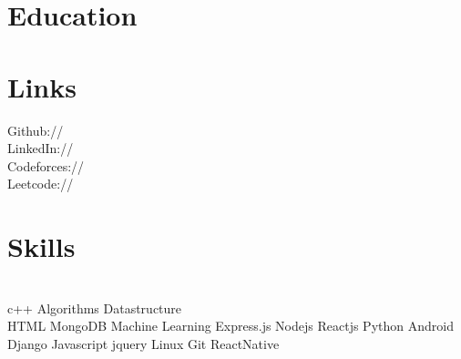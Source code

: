 \documentclass[]{deedy-resume-openfont}
\begin{document}
%
%
\lastupdated

%
%



%
%

\begin{minipage}[t]{0.33\textwidth} 


\section{Education} 

\sectionsep



\section{Links} 
Github:// \href{https://github.com/llucifer97}{} \\
LinkedIn://  \href{https://www.linkedin.com/in/ayush-raj97/}{} \\
Codeforces://  \href{https://codeforces.com/profile/ayush_raj97}{} \\
Leetcode://  \href{https://leetcode.com/llucifer97/}{}
\sectionsep



\section{Skills}
\\
c++ \textbullet{}  Algorithms \textbullet{} Datastructure\ \\ 
HTML \textbullet{} MongoDB \textbullet{} Machine Learning
Express.js \textbullet{} Nodejs\textbullet{} Reactjs\textbullet{} Python
Android \textbullet{} Django \textbullet{} Javascript \textbullet{} jquery
Linux  \textbullet{} Git \textbullet{} ReactNative
\sectionsep



\end{minipage}
\end{document}
